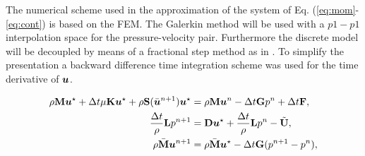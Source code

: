The numerical scheme used in the approximation of the system of Eq. (\ref{eq:mom}-\ref{eq:cont}) is based on the FEM. The Galerkin method will be used with a $p1-p1$ interpolation space for the pressure-velocity pair. Furthermore the discrete model will be decoupled by means of a fractional step method as in \cite{codina-soto}. To simplify the presentation a backward difference time integration scheme was used for the time derivative of $\boldsymbol{u}$. 

\begin{align}\label{eq:masamat}
\rho \textbf{M}\boldsymbol{u}^\star+\Delta 
t\mu\textbf{K}\boldsymbol{u}^{\star} +\rho\textbf{S}(\bar{\boldsymbol{u}}^{n+1})\boldsymbol{u}^{\star}  &=\rho \textbf{M}\boldsymbol{u}^n- \Delta 
t\textbf{G}p^n+\Delta t \textbf{F},
\\\label{eq:matpres2}
\frac{\Delta t}{\rho} \textbf{L}p^{n+1}&=\textbf{D}\boldsymbol{u}^\star+ \frac{\Delta 
t}{\rho}\textbf{L}  p^{n}-\tilde{\textbf{U}},
\\\label{eq:matunm2}
\rho \bar{\textbf{M}}\boldsymbol{u}^{n+1}&=\rho \bar{\textbf{M}}\boldsymbol{u}^\star-\Delta t\textbf{G}(p^{n+1}- p^n),
\end{align}

